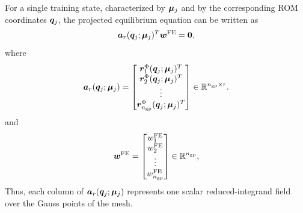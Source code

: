 \documentclass[11pt,a4paper]{article}
\begin{document}
For a single training state, characterized by $\bm{\mu}_j$ and by the corresponding
ROM coordinates $\bm{q}_j$, the projected equilibrium equation can be written as
\begin{equation}
    \bm{a}_{r}(\bm{q}_j;\bm{\mu}_j)^T \bm{w}^{\mathrm{FE}} = \bm{0},
    \label{eq:single_state_reduced_integrand_matrix}
\end{equation}
where
\begin{equation}
    \bm{a}_{r}(\bm{q}_j;\bm{\mu}_j)
    =
    \begin{bmatrix}
        \bm{r}^{\Phi}_{1}(\bm{q}_j;\bm{\mu}_j)^T\\
        \bm{r}^{\Phi}_{2}(\bm{q}_j;\bm{\mu}_j)^T\\
        \vdots\\
        \bm{r}^{\Phi}_{n_{\mathrm{gp}}}(\bm{q}_j;\bm{\mu}_j)^T
    \end{bmatrix}
    \in \mathbb{R}^{n_{\mathrm{gp}}\times r}.
    \label{eq:single_state_aforce}
\end{equation}
and
\begin{equation}
    \bm{w}^{\mathrm{FE}} =
    \begin{bmatrix}
        w^{\mathrm{FE}}_{1}\\
        w^{\mathrm{FE}}_{2}\\
        \vdots\\
        w^{\mathrm{FE}}_{n_{\mathrm{gp}}}
    \end{bmatrix}
    \in \mathbb{R}^{n_{\mathrm{gp}}},
\end{equation}
Thus, each column of $\bm{a}_{r}(\bm{q}_j;\bm{\mu}_j)$ represents one scalar
reduced-integrand field over the Gauss points of the mesh.
\end{document}
